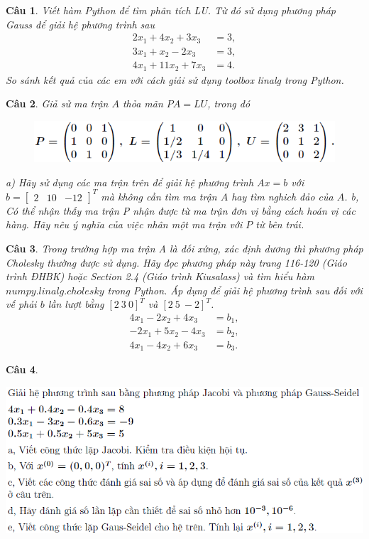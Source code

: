 \documentclass[11pt]{article}
\newtheorem{bt}{Câu}
\newcommand{\m}[1]{\begin{bmatrix}
		#1
\end{bmatrix}}
\begin{document}
\begin{bt} Viết hàm Python để tìm phân tích LU. Từ đó sử dụng phương pháp Gauss để giải hệ phương trình sau
%
\begin{align*}
 2 x_1 + 4 x_2 + 3x_3   &= 3, \\
 3 x_1 + x_2 - 2 x_3    &= 3, \\
 4 x_1 + 11 x_2 + 7 x_3 &= 4. 
\end{align*}
%
So sánh kết quả của các em với cách giải sử dụng toolbox linalg trong Python. 
\end{bt}

\begin{bt} Giả sử ma trận $A$ thỏa mãn $PA = LU$, trong đó
\begin{figure}[h!]
	\centering
	\includegraphics[scale = 0.7]{3}
\end{figure}
a) Hãy sử dụng các ma trận trên để giải hệ phương trình $Ax=b$ với $b = \m{2 & 10 & -12}^T$ mà không cần tìm ma trận $A$ hay tìm nghich đảo của $A$.
b, Có thể nhận thấy ma trận P nhận được từ ma trận đơn vị bằng cách hoán vị các hàng. Hãy nêu ý nghĩa của việc nhân một ma trận với $P$ từ bên trái.
\end{bt}


\newpage 
\begin{bt}
Trong trường hợp ma trận A là đối xứng, xác định dương thì phương pháp Cholesky thường được sử dụng. Hãy đọc phương pháp này trang 116-120 (Giáo trình ĐHBK) hoặc Section 2.4 (Giáo trình Kiusalass) và tìm hiểu hàm $numpy.linalg.cholesky$ trong Python. Áp dụng để giải hệ phương trình sau đối với vế phải $b$ lần lượt bằng $[2 \ 3 \ 0]^T$ và $[2 \ 5 \ -2]^T$.
	\begin{align*}
	4 x_1 - 2 x_2 + 4 x_3   &= b_1, \\
	-2 x_1 + 5 x_2 - 4 x_3  &= b_2, \\
	4 x_1  -4 x_2 + 6 x_3   &= b_3. 
	\end{align*}
\end{bt}

\begin{bt}
\end{bt}

\begin{center}
  \includegraphics[scale = 0.7]{4}	
\end{center}
\end{document}

